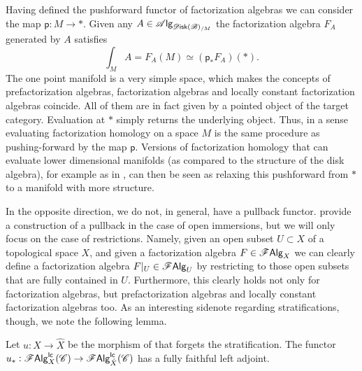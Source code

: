 \documentclass[../text.tex]{subfiles}
\begin{document}
\begin{remark}\label{rem:fh_is_pushingforward}
    Having defined the pushforward functor of factorization algebras we can consider the map $\mathsf{p}:M \rightarrow *$. Given any $A \in \alg{\disk(\bstr)_{/M}}$ the factorization algebra $F_A$ generated by $A$ satisfies
    \begin{equation}
        \int_M A  = F_A(M) \simeq (\mathsf{p}_* F_A)(*).
    \end{equation}
    The one point manifold is a very simple space, which makes the concepts of prefactorization algebras, factorization algebras and locally constant factorization algebras coincide. All of them are in fact given by a pointed object of the target category. Evaluation at $*$ simply returns the underlying object. Thus, in a sense evaluating factorization homology on a space $M$ is the same procedure as pushing-forward by the map $\mathsf{p}$. Versions of factorization homology that can evaluate lower dimensional manifolds (as compared to the structure of the disk algebra), for example as in \cite[cor.2.29]{aft_fhstrat}, can then be seen as relaxing this pushforward from $*$ to a manifold with more structure.
\end{remark} 

In the opposite direction, we do not, in general, have a pullback functor. \cite{cg2016} provide a construction of a pullback in the case of open immersions, but we will only focus on the case of restrictions. Namely, given an open subset $U \subset X$ of a topological space $X$, and given a factorization algebra $F \in \mathscr{F} \mathsf{Alg}_X$ we can clearly define a factorization algebra $F|_{U} \in \mathscr{F} \mathsf{Alg}_U$ by restricting to those open subsets that are fully contained in $U$. Furthermore, this clearly holds not only for factorization algebras, but prefactorization algebras and locally constant factorization algebras too. As an interesting sidenote regarding stratifications, though, we note the following lemma.

\begin{lemma}\label{lem:ff_functor_to_refinement}
    Let $u: X \rightarrow \hat{X}$ be the morphism of  that forgets the stratification. The functor $u_*: \mathscr{F} \mathsf{Alg}^{\mathsf{lc}}_{X} (\mathscr{C}) \rightarrow \mathscr{F} \mathsf{Alg}^{\mathsf{lc}}_{\hat{X}} (\mathscr{C})$ has a fully faithful left adjoint.
\end{lemma}
\end{document}
